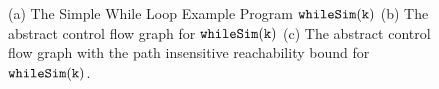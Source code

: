 \begin{example}
\begin{figure}
\begin{subfigure}{.45\textwidth}
\begin{centering}
    \caption{}
      \end{centering}
      \end{subfigure}
    \caption{(a) The Simple While Loop Example Program $\mathtt{whileSim(k)}$
    (b) The abstract control flow graph for $\mathtt{whileSim(k)}$  
    (c) The abstract control flow graph with the path insensitive reachability bound for $\mathtt{whileSim(k)}$.}
    \label{fig:whileSim_abscfg}
  \end{figure}
\end{example}